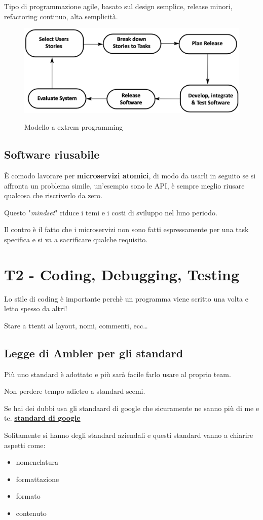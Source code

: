 \documentclass{article}
\begin{document}
Tipo di programmazione agile, basato sul design semplice, release minori,
refactoring continuo, alta semplicità.

\begin{figure}[h!]
    \centering
    \includegraphics[width=0.5\linewidth]{imgs/4 - xp.png}
    \label{fig:modello_xp}
    \caption{Modello a extrem programming}
\end{figure}

\subsection{Software riusabile}

È comodo lavorare per \textbf{microservizi atomici}, di modo da usarli in seguito 
se si affronta un problema simile, un'esempio sono le API, è sempre meglio riusare qualcosa 
che riscriverlo da zero.

Questo "\textit{mindset}" riduce i temi e i costi di sviluppo nel luno periodo.

Il contro è il fatto che i microservizi non sono fatti espressamente per una task specifica
e si va a sacrificare qualche requisito.


\section{T2 - Coding, Debugging, Testing}
Lo stile di coding è importante perchè un programma viene scritto una volta e letto
spesso da altri!

Stare a ttenti ai layout, nomi, commenti, ecc\dots

\subsection{Legge di Ambler per gli standard}
Più uno standard è adottato e più sarà facile farlo usare al proprio team.

Non perdere tempo adietro a standard scemi.

Se hai dei dubbi usa gli standaard di google che sicuramente ne sanno più di me e te.
\textbf{\href{https://google.github.io/styleguide/}{standard di google}}


Solitamente si hanno degli standard aziendali e questi standard vanno a chiarire aspetti come:
\begin{itemize}
    \item nomenclatura
    \item formattazione
    \item formato
    \item contenuto
\end{itemize}
\end{document}
